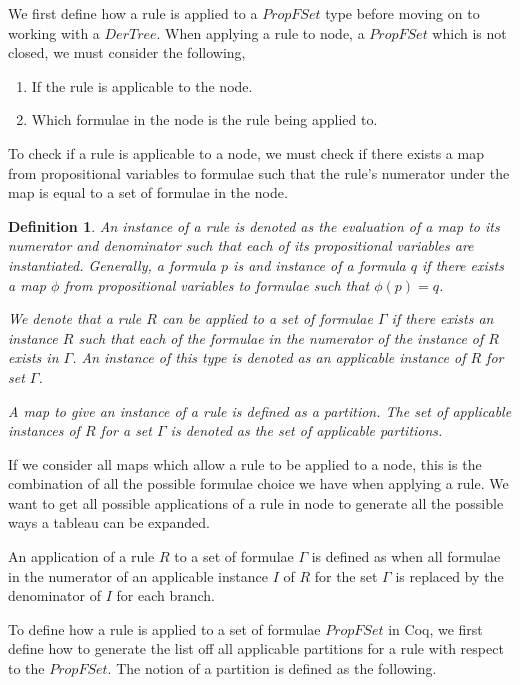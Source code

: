 \documentclass{article}
\newtheorem{definition}{Definition}
\begin{document}
We first define how a rule is applied to a $PropFSet$ type before moving on
to working with a $DerTree$. When applying a rule to node, a $PropFSet$ which
is not closed, we must consider the following,

\begin{enumerate}
\item If the rule is applicable to the node.
\item Which formulae in the node is the rule being applied to.
\end{enumerate}

To check if a rule is applicable to a node, we must check if there exists a map
from propositional variables to formulae such that the rule's numerator under
the map is equal to a set of formulae in the node.

\begin{definition}
An instance of a rule is denoted as the evaluation of a map to its numerator
and denominator such that each of its propositional variables are instantiated.
Generally, a formula $p$ is and instance of a formula $q$ if there exists a
map $\phi$ from propositional variables to formulae such that $\phi(p) = q$.

We denote that a rule $R$ can be applied to a set of formulae $\Gamma$ if there
exists an instance $R$ such that each of the formulae in the numerator of the
instance of $R$ exists in $\Gamma$. An instance of this type is denoted as an
applicable instance of $R$ for set $\Gamma$.

A map to give an instance of a rule is defined as a partition. The set of
applicable instances of $R$ for a set $\Gamma$ is denoted as the set of
applicable partitions.
\end{definition}

If we consider all maps which allow a rule to be applied to a node, this is the
combination of all the possible formulae choice we have when applying a rule.
We want to get all possible applications of a rule in node to generate all the
possible ways a tableau can be expanded.

An application of a rule $R$ to a set of formulae $\Gamma$ is defined as when
all formulae in the numerator of an applicable instance $I$ of $R$ for the set
$\Gamma$ is replaced by the denominator of $I$ for each branch.

To define how a rule is applied to a set of formulae $PropFSet$ in Coq, we
first define how to generate the list off all applicable partitions for a rule
with respect to the $PropFSet$. The notion of a partition is defined as the
following.
\end{document}
